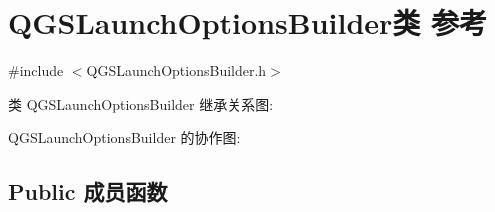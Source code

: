 \hypertarget{class_q_g_s_launch_options_builder}{}\section{Q\+G\+S\+Launch\+Options\+Builder类 参考}
\label{class_q_g_s_launch_options_builder}


{\ttfamily \#include $<$Q\+G\+S\+Launch\+Options\+Builder.\+h$>$}



类 Q\+G\+S\+Launch\+Options\+Builder 继承关系图\+:


Q\+G\+S\+Launch\+Options\+Builder 的协作图\+:
\subsection*{Public 成员函数}
